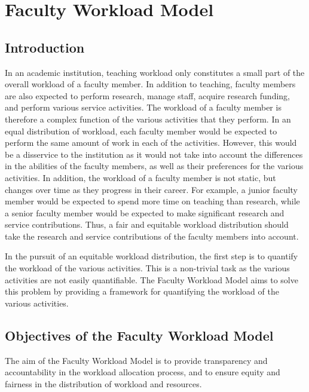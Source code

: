 
\chapter{Faculty Workload Model}

\section{Introduction}

In an academic institution, teaching workload only constitutes a small part of the overall workload of a faculty member. In addition to teaching, faculty members are also expected to perform research, manage staff, acquire research funding, and perform various service activities. The workload of a faculty member is therefore a complex function of the various activities that they perform. In an equal distribution of workload, each faculty member would be expected to perform the same amount of work in each of the activities. However, this would be a disservice to the institution as it would not take into account the differences in the abilities of the faculty members, as well as their preferences for the various activities. In addition, the workload of a faculty member is not static, but changes over time as they progress in their career. For example, a junior faculty member would be expected to spend more time on teaching than research, while a senior faculty member would be expected to make significant research and service contributions. Thus, a fair and equitable workload distribution should take the research and service contributions of the faculty members into account.

In the pursuit of an equitable workload distribution, the first step is to quantify the workload of the various activities. This is a non-trivial task as the various activities are not easily quantifiable. The Faculty Workload Model aims to solve this problem by providing a framework for quantifying the workload of the various activities.

\section{Objectives of the Faculty Workload Model}

The aim of the Faculty Workload Model is to provide transparency and accountability in the workload allocation process, and to ensure equity and fairness in the distribution of workload and resources.



